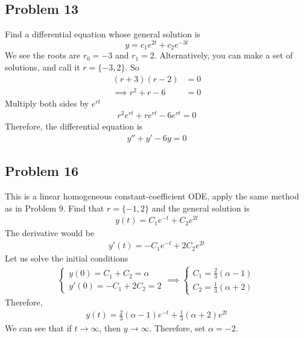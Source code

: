 \documentclass[12pt]{article}
\begin{document}
\subsection*{Problem 13}
\label{sec:org219fca6}
Find a differential equation whose general solution is
\begin{equation*}
  y=c_{1} e^{2 t}+c_{2} e^{-3 t}
\end{equation*}
We see the roots are \(r_0 = -3\) and \(r_1 = 2\). Alternatively, you can make a
set of solutions, and call it \(r = \{-3,2\}\). So
\begin{align*}
  (r+3)(r-2)&=0 \\
  \implies r^2 + r - 6 &= 0
\end{align*}
Multiply both sides by \(e^{rt}\)
\begin{align*}
  r^2e^{rt} + re^{rt} - 6e^{rt} = 0
\end{align*}
Therefore, the differential equation is
\begin{align*}
  y'' + y' - 6y = 0
\end{align*}
\subsection*{Problem 16}
\label{sec:orgebae232}
This is a linear homogeneous constant-coefficient ODE, apply the same method
as in Problem 9. Find that \(r = \{-1, 2\}\) and the general solution is
\begin{align*}
  y(t) = C_1 e^{-t} + C_2 e^{2t}
\end{align*}
The derivative would be
\begin{align*}
  y'(t) = -C_1 e^{-t} + 2 C_2 e^{2t}
\end{align*}
Let us solve the initial conditions
\begin{align*}
  \begin{cases}
    y(0) = C_1 + C_2 = \alpha\\
    y'(0) = -C_1 + 2C_2 = 2
  \end{cases}
  \implies \begin{cases}
    C_1 = \frac{2}{3}(\alpha -1)\\
    C_2 = \frac{1}{3}(\alpha +2)
  \end{cases}
\end{align*}
Therefore,
\begin{align*}
  y(t) = \frac{2}{3}(\alpha -1)e^{-t} + \frac{1}{3}(\alpha +2)e^{2t}
\end{align*}
We can see that if \(t \to \infty\), then \(y \to \infty\). Therefore, set
\(\alpha = -2\).
\end{document}
